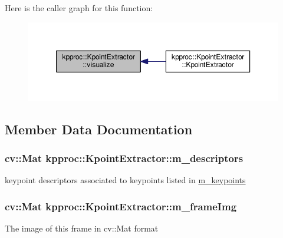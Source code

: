 Here is the caller graph for this function\+:\nopagebreak
\begin{figure}[H]
\begin{center}
\leavevmode
\includegraphics[width=350pt]{classkpproc_1_1KpointExtractor_a52e3033d4c95115f76315c228d3a1350_icgraph}
\end{center}
\end{figure}




\subsection{Member Data Documentation}
\subsubsection[{\texorpdfstring{m\+\_\+descriptors}{m_descriptors}}]{\setlength{\rightskip}{0pt plus 5cm}cv\+::\+Mat kpproc\+::\+Kpoint\+Extractor\+::m\+\_\+descriptors\hspace{0.3cm}{\ttfamily [private]}}\hypertarget{classkpproc_1_1KpointExtractor_a27bff1246cd947b3d84272a4b06b6498}{}\label{classkpproc_1_1KpointExtractor_a27bff1246cd947b3d84272a4b06b6498}
keypoint descriptors associated to keypoints listed in \hyperlink{classkpproc_1_1KpointExtractor_ace5a9a7c0bc1cea6e181b72f41588205}{m\+\_\+keypoints} 
\subsubsection[{\texorpdfstring{m\+\_\+frame\+Img}{m_frameImg}}]{\setlength{\rightskip}{0pt plus 5cm}cv\+::\+Mat kpproc\+::\+Kpoint\+Extractor\+::m\+\_\+frame\+Img}\hypertarget{classkpproc_1_1KpointExtractor_ac03e195051022be4aab2a008d05475c4}{}\label{classkpproc_1_1KpointExtractor_ac03e195051022be4aab2a008d05475c4}
The image of this frame in cv\+::\+Mat format 
